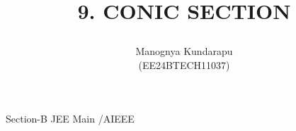 \documentclass[journal,12pt,twocolumn]{IEEEtran}
\theoremstyle{remark}
\begin{document}
%






\title{
9. CONIC SECTION

\large{}


}
\author{Manognya Kundarapu

(EE24BTECH11037)
}	





\maketitle

\newpage



\bigskip

\renewcommand{\thefigure}{\theenumi}
\renewcommand{\thetable}{\theenumi}







{Section-B JEE Main /AIEEE}
\end{document}
